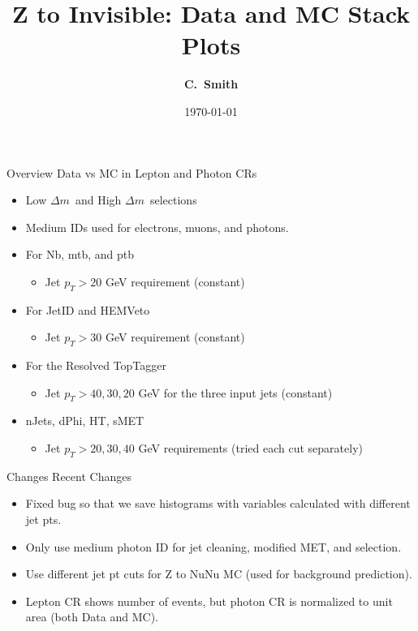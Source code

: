 \documentclass[10pt,xcolor=svgnames,fleqn,aspectratio=169]{beamer}
\title{Z to Invisible: Data and MC Stack Plots}
\author{\textcolor{DodgerBlueDark}{\bf C.~Smith\inst{1}}}
\institute{\inst{1} Baylor University}
\date{\today}
\newcommand{\dm}{$\Delta m$~}
\begin{document}
\begin{frame}[plain]
\maketitle
\end{frame}

\begin{frame}{Overview}
Data vs MC in Lepton and Photon CRs
\begin{itemize}
\item Low \dm and High \dm selections
\item Medium IDs used for electrons, muons, and photons.
\item For Nb, mtb, and ptb
\begin{itemize}
\item Jet $p_T > 20$ GeV requirement (constant)
\end{itemize}
\item For JetID and HEMVeto
\begin{itemize}
\item Jet $p_T > 30$ GeV requirement (constant)
\end{itemize}
\item For the Resolved TopTagger
\begin{itemize}
\item Jet $p_T > 40, 30, 20$ GeV for the three input jets (constant)
\end{itemize}
\item nJets, dPhi, HT, sMET
\begin{itemize}
\item Jet $p_T > 20, 30, 40$ GeV requirements (tried each cut separately)
\end{itemize}
\end{itemize}
\end{frame}

\begin{frame}{Changes}
Recent Changes
\begin{itemize}
\item Fixed bug so that we save histograms with variables calculated with different jet pts.
\item Only use medium photon ID for jet cleaning, modified MET, and selection.
\item Use different jet pt cuts for Z to NuNu MC (used for background prediction).
\item Lepton CR shows number of events, but photon CR is normalized to unit area (both Data and MC).
\end{itemize}
\end{frame}
\end{document}

